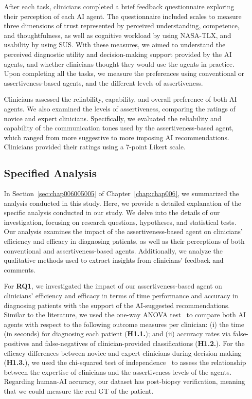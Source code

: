 After each task, clinicians completed a brief feedback questionnaire exploring their perception of each \ac{AI} agent.
The questionnaire included scales to measure three dimensions of trust represented by perceived understanding, competence, and thoughtfulness, as well as cognitive workload by using \ac{NASA-TLX}, and usability by using \ac{SUS}.
With these measures, we aimed to understand the perceived diagnostic utility and decision-making support provided by the \ac{AI} agents, and whether clinicians thought they would use the agents in practice.
Upon completing all the tasks, we measure the preferences using conventional or assertiveness-based agents, and the different levels of assertiveness.

Clinicians assessed the reliability, capability, and overall preference of both \ac{AI} agents.
We also examined the levels of assertiveness, comparing the ratings of novice and expert clinicians.
Specifically, we evaluated the reliability and capability of the communication tones used by the assertiveness-based agent, which ranged from more suggestive to more imposing \ac{AI} recommendations.
Clinicians provided their ratings using a 7-point Likert scale.

\subsection{Specified Analysis}
\label{sec:app005006005}

In Section~\ref{sec:chap006005005} of Chapter~\ref{chap:chap006}, we summarized the analysis conducted in this study.
Here, we provide a detailed explanation of the specific analysis conducted in our study.
We delve into the details of our investigation, focusing on research questions, hypotheses, and statistical tests.
Our analysis examines the impact of the assertiveness-based agent on clinicians' efficiency and efficacy in diagnosing patients, as well as their perceptions of both conventional and assertiveness-based agents.
Additionally, we analyze the qualitative methods used to extract insights from clinicians' feedback and comments.

For {\bf RQ1}, we investigated the impact of our assertiveness-based agent on clinicians' efficiency and efficacy in terms of time performance and accuracy in diagnosing patients with the support of the AI-suggested recommendations.
Similar to the literature, we used the one-way \ac{ANOVA} test~\cite{SADEGHI2022105554, 10.1145/3491102.3517791} to compare both AI agents with respect to the following outcome measures per clinician:
(i) the time (in seconds) for diagnosing each patient ({\bf H1.1.}); and
(ii) accuracy rates via false-positives and false-negatives of clinician-provided classifications ({\bf H1.2.}).
For the efficacy differences between novice and expert clinicians during decision-making ({\bf H1.3.}), we used the chi-squared test of independence~\cite{10.1145/3411764.3445464} to assess the relationship between the expertise of clinicians and the assertiveness levels of the agents.
Regarding human-AI accuracy, our dataset has post-biopsy verification, meaning that we could measure the real \ac{GT} of the patient.

